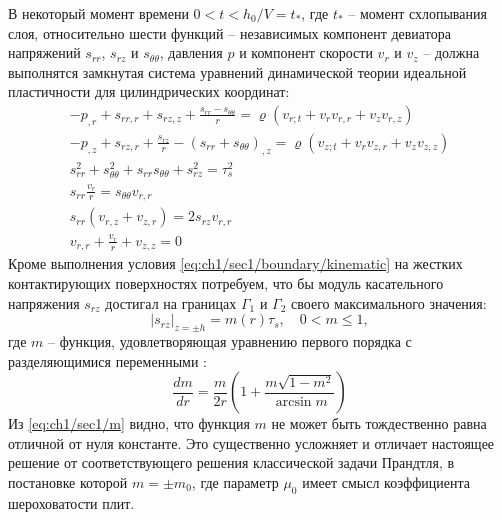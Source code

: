 В некоторый момент времени $0 < t < h_{0}/V = t_*$, где $t_*$ -- момент схлопывания слоя, относительно шести функций -- независимых компонент девиатора напряжений $s_{rr}$, $s_{rz}$ и $s_{\theta\theta}$, давления $p$ и компонент скорости $v_{r}$ и $v_{z}$ -- должна выполнятся замкнутая система уравнений динамической теории идеальной пластичности для цилиндрических координат:
\begin{subequations}
  \label{eqs:ch1/sec1/general}
  \begin{gather}
    \label{eqs:ch1/sec1/general/motion:1}
    -p_{,r}+s_{rr,r}+s_{rz,z}+\frac{s_{rr}-s_{\theta\theta}}{r} = \varrho \left(v_{r;t}+v_{r} v_{r,r} + v_{z} v_{r,z} \right)
    \\
    \label{eqs:ch1/sec1/general/motion:2}
    -p_{,z}+s_{rz,r}+\frac{s_{rz}}{r}-(s_{rr}+s_{\theta\theta})_{,z} = \varrho \left(v_{z;t}+v_{r} v_{z,r} + v_{z} v_{z,z} \right)
    \\
    \label{eqs:ch1/sec1/general/plasticity}
    s^2_{rr}+s^2_{\theta\theta}+s_{rr} s_{\theta\theta} + s^2_{rz}=\tau^2_{s}
    \\
    \label{eqs:ch1/sec1/general/coax:1}
    s_{rr} \frac{v_{r}}{r} = s_{\theta\theta} v_{r,r}
    \\
    \label{eqs:ch1/sec1/general/coax:2}
    s_{rr} (v_{r,z}+v_{z,r}) = 2 s_{rz} v_{r,r}
    \\
    \label{eqs:ch1/sec1/general/uncompress}
    v_{r,r}+\frac{v_{r}}{r}+v_{z,z} = 0
  \end{gather}
\end{subequations}
Кроме выполнения условия \cref{eq:ch1/sec1/boundary/kinematic} на жестких контактирующих поверхностях потребуем, что бы модуль касательного напряжения $s_{rz}$ достигал на границах $\Gamma_{1}$ и $\Gamma_{2}$ своего максимального значения:
\begin{equation}
  \label{eq:ch1/sec1/boundary/force}
  \lvert s_{rz}\lvert_{z=\pm h} = m(r) \tau_{s}, \quad 0 < m \le 1,
\end{equation}
где $m$ -- функция, удовлетворяющая уравнению первого порядка с разделяющимися переменными \autocite{Georgievsky:2008}:
\begin{equation}
  \label{eq:ch1/sec1/m}
  \frac{dm}{dr}=\frac{m}{2r}\left(1+\frac{m\sqrt{1-m^2}}{\arcsin m}\right)
\end{equation}
Из \cref{eq:ch1/sec1/m} видно, что функция $m$ не может быть тождественно равна отличной от нуля константе. Это существенно усложняет и отличает настоящее решение от соответствующего решения классической задачи Прандтля, в постановке которой $m = \pm m_0$, где параметр $\mu_0$  имеет смысл коэффициента шероховатости плит.

